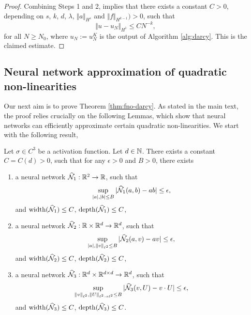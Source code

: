 \documentclass[reqno,a4paper]{amsart}
\begin{document}
\begin{proof}
Combining Steps 1 and 2, implies that there exists a constant $C>0$, depending on $s$, $k$, $d$, $\lambda$, $\Vert a \Vert_{H^s}$ and $\Vert f \Vert_{H^{k-1}})>0$, such that 
\[
\Vert u - u_N \Vert_{H^1} \le C N^{-k},
\]
for all $N\ge N_0$, where $u_N := u^K_N$ is the output of Algorithm \ref{alg:darcy}. This is the claimed estimate.
\end{proof}
\subsection{Neural network approximation of quadratic non-linearities}
\label{sec:quad}
Our next aim is to prove Theorem \ref{thm:fno-darcy}. As stated in the main text, the proof relies crucially on the following Lemmas, which show that neural networks can efficiently approximate certain quadratic non-linearities. We start with the following result,
\begin{lemma} \label{lem:quadratic}
Let $\sigma \in C^3$ be a activation function. Let $d\in \mathbb{N}$. There exists a constant $C = C(d) > 0$, such that for any $\epsilon >0$ and $B>0$, there exists 
\begin{enumerate}
\item a neural network $\widehat{\mathcal{N}}_1: \mathbb{R}^2 \to \mathbb{R}$, such that 
\[
\sup_{|a|,|b|\le B} |\widehat{\mathcal{N}}_1(a,b) - ab| \le \epsilon,
\]
and $\mathrm{width}(\widehat{\mathcal{N}}_1) \le C$, $\mathrm{depth}(\widehat{\mathcal{N}}_1) \le C$,
\item a neural network $\widehat{\mathcal{N}}_2: \mathbb{R} \times \mathbb{R}^d \to \mathbb{R}^d$, such that 
\[
\sup_{|a|,\Vert v\Vert_{\ell^2}\le B} |\widehat{\mathcal{N}}_2(a,v) - av| \le \epsilon,
\]
and $\mathrm{width}(\widehat{\mathcal{N}}_2) \le C$, $\mathrm{depth}(\widehat{\mathcal{N}}_2) \le C$,
\item a neural network $\widehat{\mathcal{N}}_3: \mathbb{R}^d \times \mathbb{R}^{d\times d}\to \mathbb{R}^d$, such that 
\[
\sup_{\Vert v\Vert_{\ell^2},\Vert U \Vert_{\ell^2\to \ell^2}\le B} |\widehat{\mathcal{N}}_3(v,U) - v\cdot U| \le \epsilon,
\]
and $\mathrm{width}(\widehat{\mathcal{N}}_3) \le C$, $\mathrm{depth}(\widehat{\mathcal{N}}_3) \le C$.
\end{enumerate}
\end{lemma}
\end{document}
